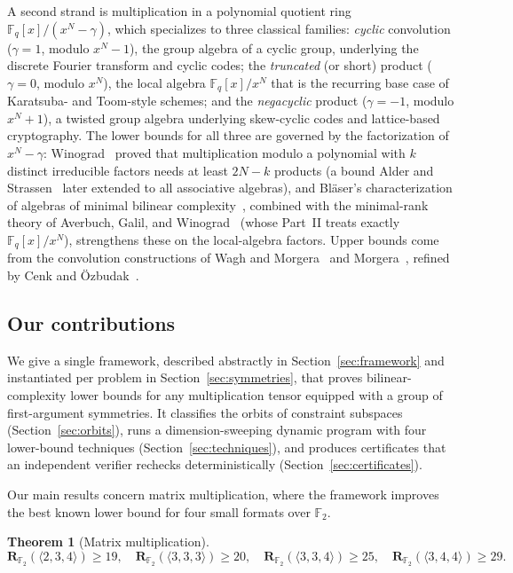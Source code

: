\documentclass[11pt]{article}
\newtheorem{theorem}{Theorem}
\theoremstyle{definition}
\newcommand{\F}{\mathbb{F}}
\newcommand{\Rk}[2]{\mathbf{R}_{#1}(#2)}
\newcommand{\mmt}[3]{\langle #1,#2,#3\rangle}
\begin{document}
A second strand is multiplication in a polynomial quotient ring
$\F_q[x]/(x^N-\gamma)$, which specializes to three classical families:
\emph{cyclic} convolution ($\gamma=1$, modulo $x^N-1$), the group algebra of a
cyclic group, underlying the discrete Fourier transform and cyclic codes; the
\emph{truncated} (or short) product ($\gamma=0$, modulo $x^N$), the local algebra
$\F_q[x]/x^N$ that is the recurring base case of Karatsuba- and Toom-style schemes;
and the \emph{negacyclic} product ($\gamma=-1$, modulo $x^N+1$), a twisted group
algebra underlying skew-cyclic codes and lattice-based cryptography. The lower bounds
for all three are governed by the factorization of $x^N-\gamma$:
Winograd~\cite{winograd1977some} proved that multiplication modulo a polynomial with
$k$ distinct irreducible factors needs at least $2N-k$ products (a bound Alder and
Strassen~\cite{alder1981algorithmic} later extended to all associative algebras), and
Bl\"aser's characterization of algebras of minimal bilinear
complexity~\cite{blaser2005complete}, combined with the minimal-rank theory of
Averbuch, Galil, and
Winograd~\cite{averbuch1988classification,averbuch1991classification} (whose Part~II
treats exactly $\F_q[x]/x^N$), strengthens these on the local-algebra factors. Upper
bounds come from the convolution constructions of Wagh and
Morgera~\cite{wagh1983structured} and Morgera~\cite{morgera1990multiplicative},
refined by Cenk and \"Ozbudak~\cite{cenk2010multiplication,cenk2011multiplication}.

\subsection{Our contributions}

We give a single framework, described abstractly in
Section~\ref{sec:framework} and instantiated per problem in
Section~\ref{sec:symmetries}, that proves bilinear-complexity lower bounds for any
multiplication tensor equipped with a group of first-argument symmetries. It
classifies the orbits of constraint subspaces (Section~\ref{sec:orbits}), runs a
dimension-sweeping dynamic program with four lower-bound techniques
(Section~\ref{sec:techniques}), and produces certificates that an independent
verifier rechecks deterministically (Section~\ref{sec:certificates}).

Our main results concern matrix multiplication, where the framework improves the
best known lower bound for four small formats over $\F_2$.

\begin{theorem}[Matrix multiplication]\label{thm:matrix}
  \[
    \Rk{\F_2}{\mmt{2}{3}{4}}\ge 19,\quad
    \Rk{\F_2}{\mmt{3}{3}{3}}\ge 20,\quad
    \Rk{\F_2}{\mmt{3}{3}{4}}\ge 25,\quad
    \Rk{\F_2}{\mmt{3}{4}{4}}\ge 29.
  \]
\end{theorem}
\end{document}
